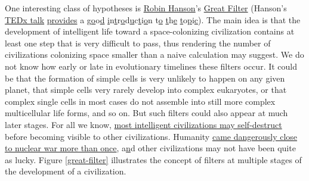 \documentclass[]{article}
\begin{document}
One interesting class of hypotheses is
\href{https://en.wikipedia.org/wiki/Robin_Hanson}{Robin Hanson}'s
\href{https://en.wikipedia.org/wiki/Great_Filter}{Great Filter}
(Hanson's \href{https://www.youtube.com/watch?v=aspMV6ERqpo}{TEDx
talk} \href{https://www.youtube.com/watch?v=aspMV6ERqpo}{provides} a
g\href{https://www.youtube.com/watch?v=aspMV6ERqpo}{o}o\href{https://www.youtube.com/watch?v=aspMV6ERqpo}{d}
\href{https://www.youtube.com/watch?v=aspMV6ERqpo}{i}n\href{https://www.youtube.com/watch?v=aspMV6ERqpo}{t}r\href{https://www.youtube.com/watch?v=aspMV6ERqpo}{o}d\href{https://www.youtube.com/watch?v=aspMV6ERqpo}{u}c\href{https://www.youtube.com/watch?v=aspMV6ERqpo}{t}i\href{https://www.youtube.com/watch?v=aspMV6ERqpo}{o}n
t\href{https://www.youtube.com/watch?v=aspMV6ERqpo}{o}
\href{https://www.youtube.com/watch?v=aspMV6ERqpo}{t}h\href{https://www.youtube.com/watch?v=aspMV6ERqpo}{e}
\href{https://www.youtube.com/watch?v=aspMV6ERqpo}{t}o\href{https://www.youtube.com/watch?v=aspMV6ERqpo}{p}i\href{https://www.youtube.com/watch?v=aspMV6ERqpo}{c}).
The main idea is that the development of intelligent life toward a
space-colonizing civilization contains at least one step that is very
difficult to pass, thus rendering the number of civilizations colonizing
space smaller than a naive calculation may suggest. We do not know how
early or late in evolutionary timelines these filters occur. It could be
that the formation of simple cells is very unlikely to happen on any
given planet, that simple cells very rarely develop into complex
eukaryotes, or that complex single cells in most cases do not assemble
into still more complex multicellular life forms, and so on. But such
filters could also appear at much later stages. For all we know,
\href{https://en.wikipedia.org/wiki/Fermi_paradox\#It_is_the_nature_of_intelligent_life_to_destroy_itself}{most
intelligent civilizations may self-destruct} before becoming visible to
other civilizations. Humanity
\href{https://en.wikipedia.org/wiki/List_of_nuclear_close_calls}{came
dangerously close to nuclear war more than once},
a\href{https://en.wikipedia.org/wiki/List_of_nuclear_close_calls}{n}d
other civilizations may not have been quite as lucky. Figure
\ref{great-filter} illustrates the concept of filters
at multiple stages of the development of a civilization.
\end{document}
